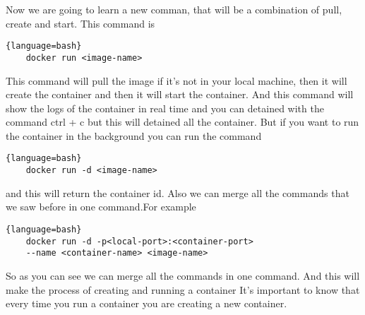 \documentclass{article}
\begin{document}
Now we are going to learn a new comman, that will be a combination of pull, create and start. This command is 
\begin{lstlisting}{language=bash}
    docker run <image-name>
\end{lstlisting}

This command will pull the image if it's not in your local machine, then it will create the container and 
then it will start the container. And this command will show the logs of the container in real time and you can 
detained with the command ctrl + c but this will detained all the container. But if you want to run the container 
in the background you can run the command
\begin{lstlisting}{language=bash}
    docker run -d <image-name>
\end{lstlisting}

and this will return the container id.  Also we can merge all the commands that we saw before in one command.For example
\begin{lstlisting}{language=bash}
    docker run -d -p<local-port>:<container-port> 
    --name <container-name> <image-name>
\end{lstlisting}

So as you can see we can merge all the commands in one command. And this will make the process of creating and running a container
It's important to know that every time you run a container you are creating a new container. 
\end{document}
